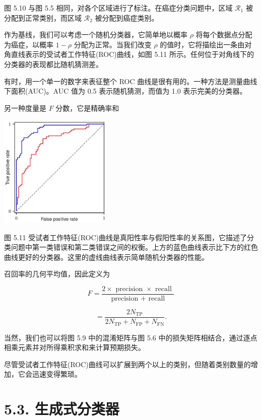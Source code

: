 \documentclass[10pt]{article}
\begin{document}
图 5.10 与图 5.5 相同，对各个区域进行了标注。在癌症分类问题中，区域 \({\mathcal{R}}_{1}\) 被分配到正常类别，而区域 \({\mathcal{R}}_{2}\) 被分配到癌症类别。

作为基线，我们可以考虑一个随机分类器，它简单地以概率 \(\rho\) 将每个数据点分配为癌症，以概率 \(1 - \rho\) 分配为正常。当我们改变 \(\rho\) 的值时，它将描绘出一条由对角直线表示的受试者工作特征(ROC)曲线，如图 5.11 所示。任何位于对角线下的分类器的表现都比随机猜测差。

有时，用一个单一的数字来表征整个 ROC 曲线是很有用的。一种方法是测量曲线下面积(AUC)。AUC 值为 0.5 表示随机猜测，而值为 1.0 表示完美的分类器。

另一种度量是 \(F\) 分数，它是精确率和

\begin{center}
\includegraphics[max width=0.4\textwidth]{images/0194e279-9b28-703a-88f4-c3ac21e2010d_169_941_345_601_610_0.jpg}
\end{center}
\hspace*{3em} 

图 5.11 受试者工作特征(ROC)曲线是真阳性率与假阳性率的关系图，它描述了分类问题中第一类错误和第二类错误之间的权衡。上方的蓝色曲线表示比下方的红色曲线更好的分类器。这里的虚线曲线表示简单随机分类器的性能。

召回率的几何平均值，因此定义为

\[
F = \frac{2 \times  \text{ precision } \times  \text{ recall }}{\text{ precision } + \text{ recall }} \tag{5.38}
\]

\[
= \frac{2{N}_{\mathrm{{TP}}}}{2{N}_{\mathrm{{TP}}} + {N}_{\mathrm{{FP}}} + {N}_{\mathrm{{FN}}}}. \tag{5.39}
\]

当然，我们也可以将图 5.9 中的混淆矩阵与图 5.6 中的损失矩阵相结合，通过逐点相乘元素并对所得乘积求和来计算预期损失。

尽管受试者工作特征(ROC)曲线可以扩展到两个以上的类别，但随着类别数量的增加，它会迅速变得繁琐。

\section*{5.3. 生成式分类器}
\end{document}
